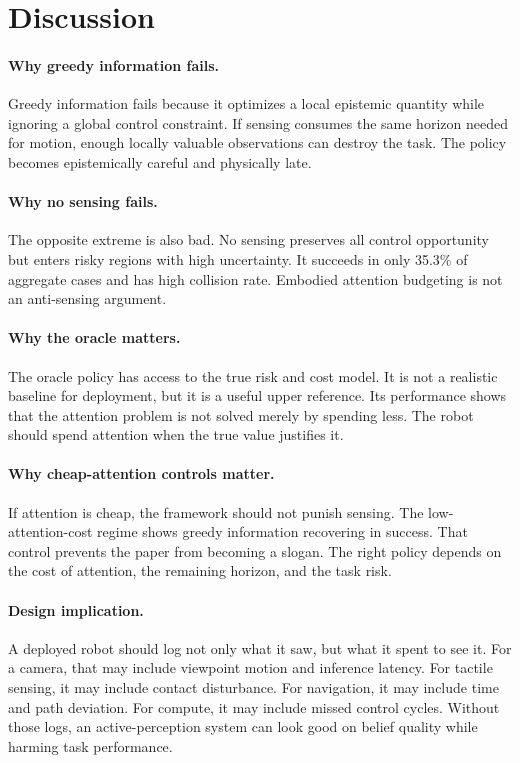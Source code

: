\documentclass{article}
\begin{document}
\section{Discussion}

\paragraph{Why greedy information fails.}
Greedy information fails because it optimizes a local epistemic quantity while
ignoring a global control constraint. If sensing consumes the same horizon
needed for motion, enough locally valuable observations can destroy the task.
The policy becomes epistemically careful and physically late.

\paragraph{Why no sensing fails.}
The opposite extreme is also bad. No sensing preserves all control opportunity
but enters risky regions with high uncertainty. It succeeds in only 35.3\% of
aggregate cases and has high collision rate. Embodied attention budgeting is
not an anti-sensing argument.

\paragraph{Why the oracle matters.}
The oracle policy has access to the true risk and cost model. It is not a
realistic baseline for deployment, but it is a useful upper reference. Its
performance shows that the attention problem is not solved merely by spending
less. The robot should spend attention when the true value justifies it.

\paragraph{Why cheap-attention controls matter.}
If attention is cheap, the framework should not punish sensing. The
low-attention-cost regime shows greedy information recovering in success. That
control prevents the paper from becoming a slogan. The right policy depends on
the cost of attention, the remaining horizon, and the task risk.

\paragraph{Design implication.}
A deployed robot should log not only what it saw, but what it spent to see it.
For a camera, that may include viewpoint motion and inference latency. For
tactile sensing, it may include contact disturbance. For navigation, it may
include time and path deviation. For compute, it may include missed control
cycles. Without those logs, an active-perception system can look good on
belief quality while harming task performance.
\end{document}
